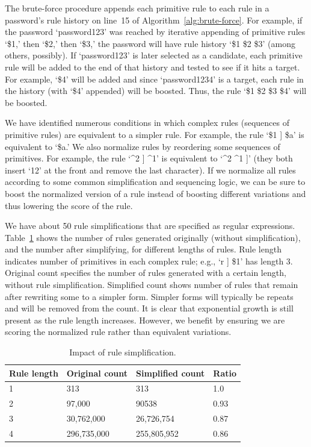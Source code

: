 \documentclass{article}
\begin{document}
The brute-force procedure appends each primitive rule to each rule in a
password's rule history on line~15 of Algorithm~\ref{alg:brute-force}. For
example, if the password `password123'
was reached by iterative appending of primitive rules `\$1,' then `\$2,' then
`\$3,' the password will have rule history `\$1 \$2 \$3' (among others,
possibly). If `password123' is later selected as a candidate, each primitive
rule will be added to the end of that history and tested to see if it hits a
target. For example, `\$4' will be added and since `password1234' is a target,
each rule in the history (with `\$4' appended) will be boosted. Thus, the rule
`\$1 \$2 \$3 \$4' will be boosted.

We have identified numerous conditions in which complex rules (sequences of
primitive rules) are equivalent to a simpler rule. For example, the rule `\$1 ]
\$a' is equivalent to `\$a.' We also normalize rules by reordering some
sequences of primitives. For example, the rule `\^{}2 ] \^{}1' is equivalent to
`\^{}2 \^{}1 ]' (they both insert `12' at the front and remove the last
character). If we normalize all rules according to some common simplification
and sequencing logic, we can be sure to boost the normalized version of a rule
instead of boosting different variations and thus lowering the score of the
rule.

We have about 50 rule simplifications that are specified as regular
expressions. Table~\ref{tab:rule-simplification} shows the number of rules
generated originally (without simplification), and the number after simplifying,
for different lengths of rules. Rule length indicates number of
primitives in each complex rule; e.g., `r ] \$1' has length 3. Original count
specifies the number of rules generated with a certain length, without rule
simplification. Simplified count shows number of rules that remain after
rewriting some to a simpler form. Simpler forms will typically be repeats and
will be removed from the count. It is clear that exponential growth is still
present as the rule length increases. However, we benefit by ensuring we are
scoring the normalized rule rather than equivalent variations.

\begin{table}[h!]
\centering
\begin{tabular}{|l|l|l|l|}
\hline
Rule length & Original count & Simplified count & Ratio \\
\hline
1 & 313 & 313 & 1.0 \\
2 & 97,000 & 90538 & 0.93 \\
3 & 30,762,000 & 26,726,754 & 0.87 \\
4 & 296,735,000 & 255,805,952 & 0.86 \\
\hline
\end{tabular}
\caption{Impact of rule simplification. }
\label{tab:rule-simplification}
\end{table}
\end{document}
